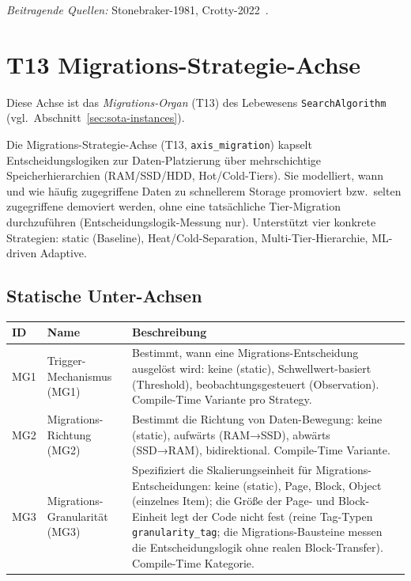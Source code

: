 \emph{Beitragende Quellen:} Stonebraker-1981, Crotty-2022~\cite{stonebraker1981os,crotty2022mmap}.

\section{T13 Migrations-Strategie-Achse}

Diese Achse ist das \emph{Migrations-Organ} (T13) des Lebewesens \texttt{SearchAlgorithm} (vgl.\ Abschnitt~\ref{sec:sota-instances}).

Die Migrations-Strategie-Achse (T13, \texttt{axis\_\allowbreak{}migration}) kapselt Entscheidungslogiken zur Daten-Platzierung über mehrschichtige Speicherhierarchien (RAM/\allowbreak{}SSD/\allowbreak{}HDD, Hot/\allowbreak{}Cold-Tiers). Sie modelliert, wann und wie häufig zugegriffene Daten zu schnellerem Storage promoviert bzw.\ selten zugegriffene demoviert werden, ohne eine tatsächliche Tier-Migration durchzuführen (Entscheidungslogik-Messung nur). Unterstützt vier konkrete Strategien: static (Baseline), Heat/\allowbreak{}Cold-Separation, Multi-Tier-Hierarchie, ML-driven Adaptive.

\subsection*{Statische Unter-Achsen}

\begin{scriptsize}
\begin{longtable}{@{}>{\raggedright\arraybackslash}p{1.8cm} >{\raggedright\arraybackslash}p{3.2cm} >{\raggedright\arraybackslash}p{8.5cm}@{}}
\toprule
ID & Name & Beschreibung \\
\midrule
\endhead%
MG1 & Trigger-Mechanismus (MG1) & Bestimmt, wann eine Migrations-Entscheidung ausgelöst wird: keine (static), Schwellwert-basiert (Threshold), beobachtungsgesteuert (Observation). Compile-Time Variante pro Strategy. \\
MG2 & Migrations-Richtung (MG2) & Bestimmt die Richtung von Daten-Bewegung: keine (static), aufwärts (RAM→SSD), abwärts (SSD→RAM), bidirektional. Compile-Time Variante. \\
MG3 & Migrations-Granularität (MG3) & Spezifiziert die Skalierungseinheit für Migrations-Entscheidungen: keine (static), Page, Block, Object (einzelnes Item); die Größe der Page- und Block-Einheit legt der Code nicht fest (reine Tag-Typen \texttt{granularity\_\allowbreak{}tag}; die Migrations-Bausteine messen die Entscheidungslogik ohne realen Block-Transfer). Compile-Time Kategorie. \\
\bottomrule
\end{longtable}
\end{scriptsize}

